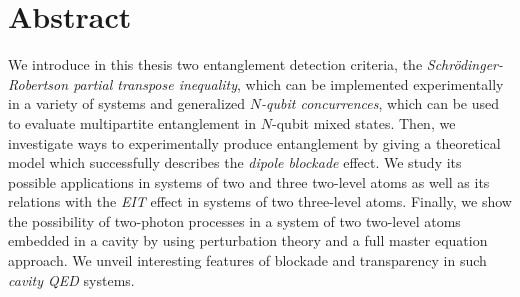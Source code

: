 \chapter*{Abstract}

We introduce in this thesis two entanglement detection criteria, the \textit{Schr\"odinger-Robertson partial transpose inequality}, which can be implemented experimentally in a variety of systems and generalized \textit{$N$-qubit concurrences}, which can be used to evaluate multipartite entanglement in $N$-qubit mixed states. Then, we investigate ways to experimentally produce entanglement by giving a theoretical model which successfully describes the \textit{dipole blockade} effect. We study its possible applications in systems of two and three two-level atoms as well as its relations with the \textit{EIT} effect in systems of two three-level atoms. Finally, we show the possibility of two-photon processes in a system of two two-level atoms embedded in a cavity by using perturbation theory and a full master equation approach. We unveil interesting features of blockade and transparency in such \textit{cavity QED} systems.
